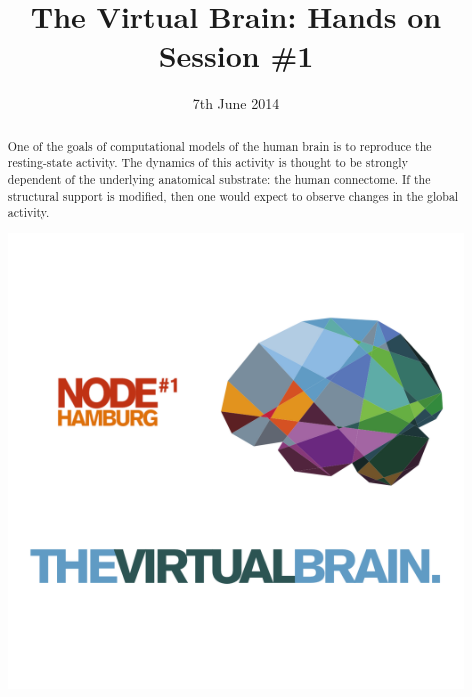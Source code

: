 \documentclass{tufte-handout}
\title{The Virtual Brain: Hands on Session \#1}
\date{7th June 2014}
\begin{document}
\maketitle %

\begin{abstract}
\noindent One of the goals of computational models of the human brain is to reproduce
the resting-state activity. The dynamics of this activity is thought to be
strongly dependent of the underlying anatomical substrate: the human
connectome. If the structural support is modified, then one would expect to
observe changes in the global activity.

\begin{marginfigure}%
  \includegraphics[width=\linewidth]{tvb_logo_transparent_square}
  \label{fig:marginfig}
\end{marginfigure}
\end{abstract}


\end{document}
